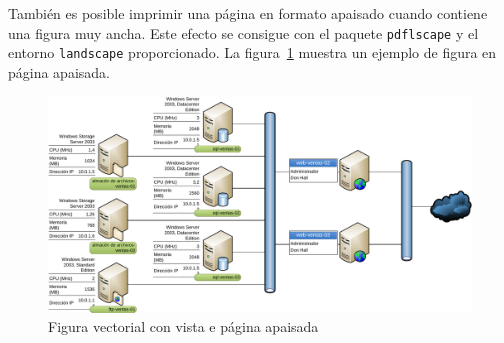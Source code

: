 \documentclass[11pt,a4paper]{article}
\begin{document}
\begin{landscape}
También es posible imprimir una página en formato apaisado cuando contiene una figura muy ancha. Este efecto se consigue con el paquete \texttt{pdflscape} y el entorno \texttt{landscape} proporcionado. La figura~\ref{fig:apaisada} muestra un ejemplo de figura en página apaisada.

\begin{figure}[H]
	\centering
	\includegraphics[width=0.98\linewidth]{../figs/network} 
	\caption[Gráfico apaisado de Visio (pdf)]{Figura vectorial con vista e página apaisada}
	\label{fig:apaisada}
\end{figure}
\end{landscape}
\end{document}
